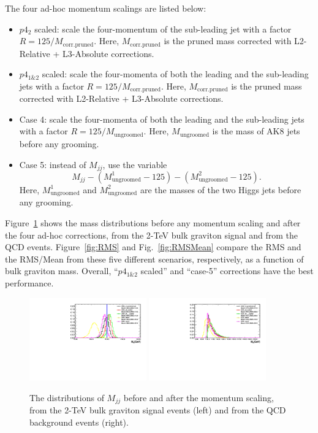The four ad-hoc momentum scalings are listed below:
\begin{itemize}
\item $p4_2$ scaled: scale the four-momentum of the sub-leading jet 
 with a factor $R=125/M_\mathrm{corr. pruned}$. Here, $M_\mathrm{corr. pruned}$
is the pruned mass corrected with L2-Relative + L3-Absolute corrections.

\item $p4_{1\&2}$ scaled: scale the four-momenta of both the leading 
 and the sub-leading jets with a factor $R=125/M_\mathrm{corr. pruned}$. 
Here, $M_\mathrm{corr. pruned}$ 
is the pruned mass corrected with L2-Relative + L3-Absolute corrections. 
\item Case 4: scale the four-momenta of both the leading 
 and the sub-leading jets with a factor $R=125/M_\mathrm{ungroomed}$. Here, 
 $M_\mathrm{ungroomed}$ is the mass of AK8 jets before any grooming.
\item Case 5: instead of $M_{jj}$, use the variable 
 \[M_{jj} - (M_\mathrm{ungroomed}^1-125) - (M_\mathrm{ungroomed}^2-125).\] 
Here, $M_\mathrm{ungroomed}^1$ and $M_\mathrm{ungroomed}^2$ are 
the masses of the two Higgs jets before any grooming.
\end{itemize}


Figure~\ref{fig:massresol} shows the mass distributions before any momentum 
scaling and after the four ad-hoc corrections, from the 2-TeV bulk 
graviton signal and from the QCD events. 
Figure~\ref{fig:RMS} and Fig.~\ref{fig:RMSMean} compare the RMS and the 
RMS/Mean from these five different scenarios, respectively, as a function of 
bulk graviton mass. Overall, ``$p4_{1\&2}$ scaled'' and 
``case-5'' corrections have the best performance.


\begin{figure}[htbp]
   \centering
   \includegraphics[width=0.45\textwidth]{figures/scale_mass/allcuts_2000.pdf}
   \includegraphics[width=0.45\textwidth]{figures/scale_mass/allcuts_QCD.pdf}
   \caption{The distributions of $M_{jj}$ before and after the momentum 
     scaling, from the 2-TeV bulk graviton signal events (left) and from 
     the QCD background events (right).}
   \label{fig:massresol}
\end{figure}


